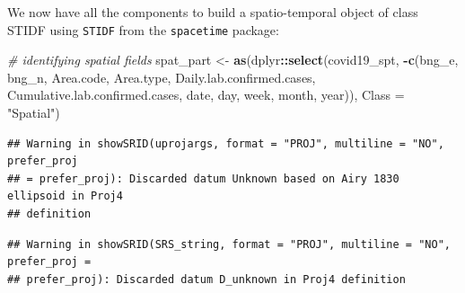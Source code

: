 \documentclass[
]{book}
\newenvironment{Shaded}{\begin{snugshade}}{\end{snugshade}}
\newcommand{\CommentTok}[1]{\textcolor[rgb]{0.56,0.35,0.01}{\textit{#1}}}
\newcommand{\DataTypeTok}[1]{\textcolor[rgb]{0.13,0.29,0.53}{#1}}
\newcommand{\KeywordTok}[1]{\textcolor[rgb]{0.13,0.29,0.53}{\textbf{#1}}}
\newcommand{\NormalTok}[1]{#1}
\newcommand{\OperatorTok}[1]{\textcolor[rgb]{0.81,0.36,0.00}{\textbf{#1}}}
\newcommand{\StringTok}[1]{\textcolor[rgb]{0.31,0.60,0.02}{#1}}
\begin{document}
We now have all the components to build a spatio-temporal object of class STIDF using \texttt{STIDF} from the \texttt{spacetime} package:

\begin{Shaded}
\begin{Highlighting}[]
\CommentTok{# identifying spatial fields}
\NormalTok{spat_part <-}\StringTok{ }\KeywordTok{as}\NormalTok{(dplyr}\OperatorTok{::}\KeywordTok{select}\NormalTok{(covid19_spt, }\OperatorTok{-}\KeywordTok{c}\NormalTok{(bng_e, bng_n, Area.code, Area.type, Daily.lab.confirmed.cases, Cumulative.lab.confirmed.cases, date, day, week, month, year)), }\DataTypeTok{Class =} \StringTok{"Spatial"}\NormalTok{)}
\end{Highlighting}
\end{Shaded}

\begin{verbatim}
## Warning in showSRID(uprojargs, format = "PROJ", multiline = "NO", prefer_proj
## = prefer_proj): Discarded datum Unknown based on Airy 1830 ellipsoid in Proj4
## definition
\end{verbatim}

\begin{verbatim}
## Warning in showSRID(SRS_string, format = "PROJ", multiline = "NO", prefer_proj =
## prefer_proj): Discarded datum D_unknown in Proj4 definition
\end{verbatim}

\begin{Shaded}
\end{Shaded}
\end{document}
